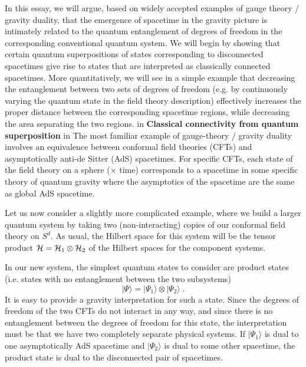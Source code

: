 \documentclass[12pt,epsf]{article}
\renewcommand{\(}{\left(}
\renewcommand{\)}{\right)}
\begin{document}
In this essay, we will argue, based on widely accepted examples of gauge theory / gravity duality, that the emergence of spacetime in the gravity picture is intimately related to the quantum entanglement of degrees of freedom in the corresponding conventional quantum system. We will begin by showing that certain quantum superpositions of states corresponding to disconnected spacetimes give rise to states that are interpreted as classically connected spacetimes.  More quantitatively, we will see in a simple example that decreasing the entanglement between two sets of degrees of freedom (e.g. by continuously varying the quantum state in the field theory description) effectively increases the proper distance between the corresponding spacetime regions, while decreasing the area separating the two regions.
 in
\noindent
{\bf Classical connectivity from quantum superposition}
 in
\noindent
The most familiar example of gauge-theory / gravity duality involves an equivalence between conformal field theories (CFTs) and asymptotically anti-de Sitter (AdS) spacetimes. For specific CFTs, each state of the field theory on a sphere ($\times$ time) corresponds to a spacetime in some specific theory of quantum gravity where the asymptotics of the spacetime are the same as global AdS spacetime.

Let us now consider a slightly more complicated example, where we build a larger quantum system by taking two (non-interacting) copies of our conformal field theory on $S^d$. As usual, the Hilbert space for this system will be the tensor product ${\cal H} = {\cal H}_1 \otimes {\cal H}_2$ of the Hilbert spaces for the component systems.

In our new system, the simplest quantum states to consider are product states (i.e. states with no entanglement between the two subsystems)
\[
|\Psi \rangle = |\Psi_1 \rangle \otimes |\Psi_2 \rangle \; .
\]
It is easy to provide a gravity interpretation for such a state. Since the degrees of freedom of the two CFTs do not interact in any way, and since there is no entanglement between the degrees of freedom for this state, the interpretation must be that we have two completely separate physical systems. If $|\Psi_1 \rangle$ is dual to one asymptotically AdS spacetime and $|\Psi_2 \rangle$ is dual to some other spacetime, the product state is dual to the disconnected pair of spacetimes.
\end{document}
